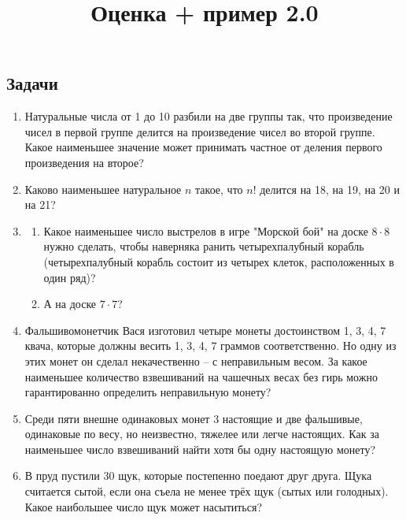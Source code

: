 \documentclass[a4paper,12pt]{article}
\title{Оценка + пример 2.0}
\begin{document}
\maketitle
    \subsection*{Задачи}
    \begin{enumerate}
        \item Натуральные числа от 1 до 10 разбили на две группы так, что произведение чисел в первой группе делится на произведение чисел во второй группе. Какое наименьшее значение может принимать частное от деления первого произведения на второе?
        \item Каково наименьшее натуральное $n$ такое, что $n!$ делится на 18, на 19, на 20 и на 21?  
        \item \begin{enumerate}
            \item Какое наименьшее число выстрелов в игре "Морской бой" на доске $8 \cdot 8$ нужно сделать, чтобы наверняка ранить четырехпалубный корабль (четырехпалубный корабль состоит из четырех клеток, расположенных в один ряд)?
            \item А на доске $7 \cdot 7$?
        \end{enumerate}
        \item Фальшивомонетчик Вася изготовил четыре монеты достоинством 1, 3, 4, 7 квача, которые должны весить 1, 3, 4, 7 граммов соответственно. Но одну из этих монет он сделал некачественно – с неправильным весом. За какое наименьшее количество взвешиваний на чашечных весах без гирь можно гарантированно определить неправильную монету?
        \item Среди пяти внешне одинаковых монет 3 настоящие и две фальшивые, одинаковые по весу, но неизвестно, тяжелее или легче настоящих. Как за наименьшее число взвешиваний найти хотя бы одну настоящую монету?
        \item В пруд пустили 30 щук, которые постепенно поедают друг друга. Щука считается сытой, если она съела не менее трёх щук (сытых или голодных). Какое наибольшее число щук может насытиться?
    \end{enumerate}
\end{document}
